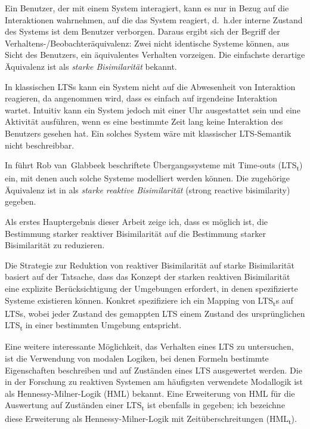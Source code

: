 \documentclass[11pt,a4paper,openany]{book}
\newcommand{\LTSt}{LTS\textsubscript{t}}
\newcommand{\HMLt}{HML\textsubscript{t}}
\begin{document}
Ein Benutzer, der mit einem System interagiert, kann es nur in Bezug auf die Interaktionen wahrnehmen, auf die das System reagiert, d.\@~h.\@ der interne Zustand des Systems ist dem Benutzer verborgen. Daraus ergibt sich der Begriff der Verhaltens-/Beobachteräquivalenz: Zwei nicht identische Systeme können, aus Sicht des Benutzers, ein äquivalentes Verhalten vorzeigen. Die einfachste derartige Äquivalenz ist als \emph{starke Bisimilarität} bekannt.

In klassischen LTSs kann ein System nicht auf die Abwesenheit von Interaktion reagieren, da angenommen wird, dass es einfach auf irgendeine Interaktion wartet. Intuitiv kann ein System jedoch mit einer Uhr ausgestattet sein und eine Aktivität ausführen, wenn es eine bestimmte Zeit lang keine Interaktion des Benutzers gesehen hat. Ein solches System wäre mit klassischer LTS-Semantik nicht beschreibbar.

\pagebreak
In \cite{vanglabbeek2021failure} führt Rob van~Glabbeek beschriftete Übergangssysteme mit Time-outs (\LTSt{}) ein, mit denen auch solche Systeme modelliert werden können.
Die zugehörige Äquivalenz ist in \cite{rbs} als \emph{starke reaktive Bisimilarität} (strong reactive bisimilarity) gegeben.

Als erstes Hauptergebnis dieser Arbeit zeige ich, dass es möglich ist, die Bestimmung starker reaktiver Bisimilarität auf die Bestimmung starker \linebreak Bisimilarität zu reduzieren.

Die Strategie zur Reduktion von reaktiver Bisimilarität auf starke Bisimilarität basiert auf der Tatsache, dass das Konzept der starken reaktiven Bisimilarität eine explizite Berücksichtigung der Umgebungen erfordert, in denen spezifizierte Systeme existieren können. Konkret spezifiziere ich ein Mapping von \LTSt{}s auf LTSs, wobei jeder Zustand des gemappten LTS einem Zustand des ursprünglichen \LTSt{} in einer bestimmten Umgebung entspricht.

Eine weitere interessante Möglichkeit, das Verhalten eines LTS zu untersuchen, ist die Verwendung von modalen Logiken, bei denen Formeln bestimmte Eigenschaften beschreiben und auf Zuständen eines LTS ausgewertet werden. Die in der Forschung zu reaktiven Systemen am häufigsten verwendete Modallogik ist als Hennessy-Milner-Logik (HML) bekannt. 
Eine Erweiterung von HML für die Auswertung auf Zuständen einer \LTSt{} ist ebenfalls in \cite{rbs} gegeben; ich bezeichne diese Erweiterung als Hennessy-Milner-Logik mit Zeitüberschreitungen (\HMLt{}).
\end{document}
